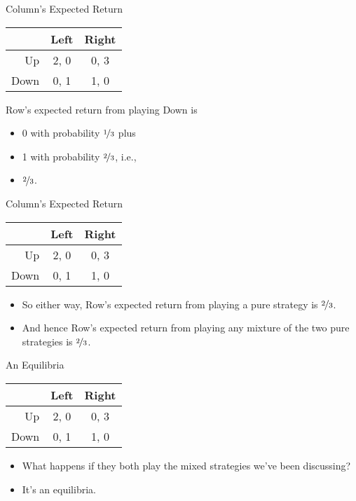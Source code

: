 \documentclass[
  ignorenonframetext,
]{beamer}
\providecommand{\tightlist}{%
  \setlength{\itemsep}{0pt}\setlength{\parskip}{0pt}}
\begin{document}
\begin{frame}{Column's Expected Return}
\protect\hypertarget{columns-expected-return-3}{}
\begin{table}[!h]
\centering
\begin{tabular}[t]{>{}r|cc}
\toprule
 & Left & Right\\
\midrule
Up & 2, 0 & 0, 3\\
Down & 0, 1 & 1, 0\\
\bottomrule
\end{tabular}
\end{table}

Row's expected return from playing Down is

\begin{itemize}
\tightlist
\item
  0 with probability \(\nicefrac{1}{3}\) plus
\item
  1 with probability \(\nicefrac{2}{3}\), i.e.,
\item
  \(\nicefrac{2}{3}\).
\end{itemize}
\end{frame}

\begin{frame}{Column's Expected Return}
\protect\hypertarget{columns-expected-return-4}{}
\begin{table}[!h]
\centering
\begin{tabular}[t]{>{}r|cc}
\toprule
 & Left & Right\\
\midrule
Up & 2, 0 & 0, 3\\
Down & 0, 1 & 1, 0\\
\bottomrule
\end{tabular}
\end{table}

\begin{itemize}
\tightlist
\item
  So either way, Row's expected return from playing a pure strategy is
  \(\nicefrac{2}{3}\).
\item
  And hence Row's expected return from playing any mixture of the two
  pure strategies is \(\nicefrac{2}{3}\).
\end{itemize}
\end{frame}

\begin{frame}{An Equilibria}
\protect\hypertarget{an-equilibria}{}
\begin{table}[!h]
\centering
\begin{tabular}[t]{>{}r|cc}
\toprule
 & Left & Right\\
\midrule
Up & 2, 0 & 0, 3\\
Down & 0, 1 & 1, 0\\
\bottomrule
\end{tabular}
\end{table}

\begin{itemize}
\tightlist
\item
  What happens if they both play the mixed strategies we've been
  discussing? \pause
\item
  It's an equilibria.
\end{itemize}
\end{frame}
\end{document}

